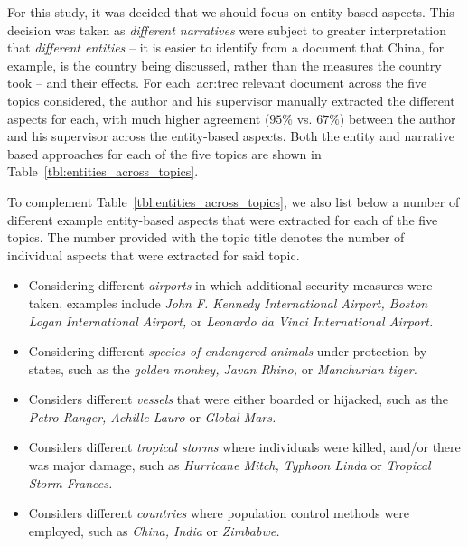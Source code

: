 For this study, it was decided that we should focus on entity-based aspects. This decision was taken as \emph{different narratives} were subject to greater interpretation that \emph{different entities} -- it is easier to identify from a document that China, for example, is the country being discussed, rather than the measures the country took -- and their effects. For each~\gls{acr:trec} relevant document across the five topics considered, the author and his supervisor manually extracted the different aspects for each, with much higher agreement ($95\%$ vs. $67\%$) between the author and his supervisor across the entity-based aspects. Both the entity and narrative based approaches for each of the five topics are shown in Table~\ref{tbl:entities_across_topics}.

To complement Table~\ref{tbl:entities_across_topics}, we also list below a number of different example entity-based aspects that were extracted for each of the five topics. The number provided with the topic title denotes the number of individual aspects that were extracted for said topic.

\begin{itemize}
    \item{ Considering different \emph{airports} in which additional security measures were taken, examples include \emph{John F. Kennedy International Airport, Boston Logan International Airport,} or \emph{Leonardo da Vinci International Airport.}}
    \item{ Considering different \emph{species of endangered animals} under protection by states, such as the \emph{golden monkey, Javan Rhino,} or \emph{Manchurian tiger.}}
    \item{ Considers different \emph{vessels} that were either boarded or hijacked, such as the \emph{Petro Ranger, Achille Lauro} or \emph{Global Mars.}}
    \item{ Considers different \emph{tropical storms} where individuals were killed, and/or there was major damage, such as \emph{Hurricane Mitch, Typhoon Linda} or \emph{Tropical Storm Frances.}}
    \item{ Considers different \emph{countries} where population control methods were employed, such as \emph{China, India} or \emph{Zimbabwe.}}
\end{itemize}


